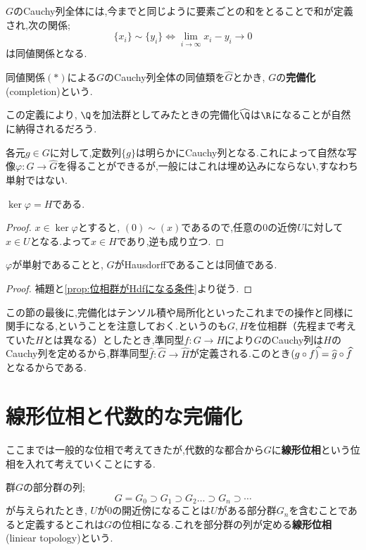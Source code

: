 $G$のCauchy列全体には,今までと同じように要素ごとの和をとることで和が定義され,次の関係;
\[\{x_i\}\sim\{y_i\}\Longleftrightarrow \lim_{i\to\infty} x_i-y_i\to 0\tag{$\ast$}\]
は同値関係となる.

\begin{defi}[完備化]
	同値関係$(\ast)$による$G$のCauchy列全体の同値類を$\widehat G$とかき, $G$の\textbf{完備化}(completion)という.
\end{defi}

この定義により, $\Q$を加法群としてみたときの完備化$\widehat{\Q}$は$\R$になることが自然に納得されるだろう. 

各元$g\in G$に対して,定数列$\{g\}$は明らかにCauchy列となる.これによって自然な写像$\varphi:G\to\widehat{G}$を得ることができるが,一般にはこれは埋め込みにならない,すなわち単射ではない.

\begin{lem}
	$\ker\varphi=H$である.
\end{lem}

\begin{proof}
	$x\in\ker\varphi$とすると, $(0)\sim(x)$であるので,任意の$0$の近傍$U$に対して$x\in U$となる.よって$x\in H$であり,逆も成り立つ.
\end{proof}

\begin{prop}
	$\varphi$が単射であることと, $G$がHausdorffであることは同値である.
\end{prop}

\begin{proof}
	補題と\ref{prop:位相群がHdfになる条件}より従う.
\end{proof}

この節の最後に,完備化はテンソル積や局所化といったこれまでの操作と同様に関手になる,ということを注意しておく.というのも$G,H$を位相群（先程まで考えていた$H$とは異なる）としたとき,準同型$f:G\to H$により$G$のCauchy列は$H$のCauchy列を定めるから,群準同型$\widehat{f}:\widehat{G}\to\widehat{H}$が定義される.このとき$(g\circ f)\widehat{\mathstrut}=\widehat{g}\circ\widehat{f}$となるからである.
\section{線形位相と代数的な完備化}

ここまでは一般的な位相で考えてきたが,代数的な都合から$G$に\textbf{線形位相}という位相を入れて考えていくことにする.

\begin{defi}[線形位相]
	群$G$の部分群の列;
	\[G=G_0\supset G_1\supset G_2\dots\supset G_n\supset\cdots\]
	が与えられたとき, $U$が$0$の開近傍になることは$U$がある部分群$G_n$を含むことであると定義するとこれは$G$の位相になる.これを部分群の列が定める\textbf{線形位相}(liniear topology)という.
\end{defi}

